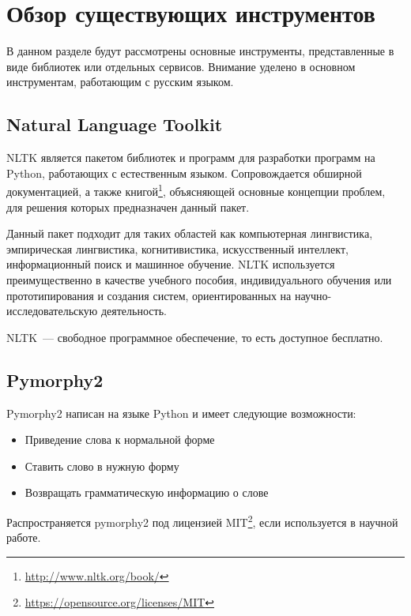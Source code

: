 \documentclass[14pt]{matmex-diploma-custom}
\begin{document}
\clearpage\section{Обзор существующих инструментов}

\label{sec:overview}

В данном разделе будут рассмотрены основные инструменты, представленные в виде библиотек или отдельных сервисов. Внимание уделено в основном инструментам, работающим с русским языком.

\subsection{Natural Language Toolkit}

NLTK\cite{tools:nltk} является пакетом библиотек и программ для разработки программ на Python, работающих с естественным языком. Сопровождается обширной документацией, а также книгой\footnote{\url{http://www.nltk.org/book/}}, объясняющей основные концепции проблем, для решения которых предназначен данный пакет.

Данный пакет подходит для таких областей как компьютерная лингвистика, эмпирическая лингвистика, когнитивистика, искусственный интеллект, информационный поиск и машинное обучение. NLTK используется преимущественно в качестве учебного пособия, индивидуального обучения или прототипирования и создания систем, ориентированных на научно-исследовательскую деятельность.

NLTK~--- свободное программное обеспечение, то есть доступное бесплатно.

\subsection{Pymorphy2}

Pymorphy2\cite{tools:pymorphy2} написан на языке Python и имеет следующие возможности:

\begin{itemize}

\item Приведение слова к нормальной форме

\item Ставить слово в нужную форму

\item Возвращать грамматическую информацию о слове

\end{itemize}

Распространяется pymorphy2 под лицензией MIT\footnote{\url{https://opensource.org/licenses/MIT}}, если используется в научной работе.
\end{document}
